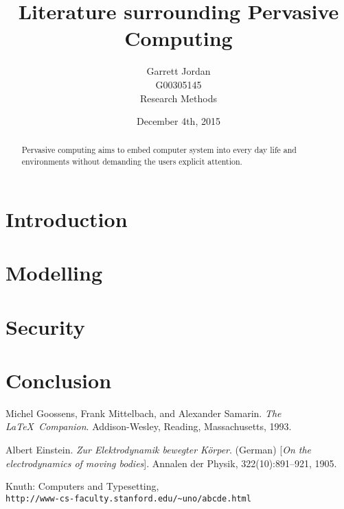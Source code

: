 \documentclass[]{report}
\title{Literature surrounding Pervasive Computing}
\author{Garrett Jordan\\G00305145\\Research Methods}
\date{December 4th, 2015}
\begin{document}
\maketitle

\begin{abstract}
Pervasive computing aims to embed computer system into every day life and environments without demanding the users explicit attention.
\end{abstract}

\section{Introduction}
\cite{1}
\section{Modelling}
\section{Security}
\section{Conclusion}

\medskip
 
\begin{thebibliography}{9}
Michel Goossens, Frank Mittelbach, and Alexander Samarin. 
\textit{The \LaTeX\ Companion}. 
Addison-Wesley, Reading, Massachusetts, 1993.
 
Albert Einstein. 
\textit{Zur Elektrodynamik bewegter K{\"o}rper}. (German) 
[\textit{On the electrodynamics of moving bodies}]. 
Annalen der Physik, 322(10):891–921, 1905.
 
Knuth: Computers and Typesetting,
\\\texttt{http://www-cs-faculty.stanford.edu/\~{}uno/abcde.html}
\end{thebibliography}
\end{document}
